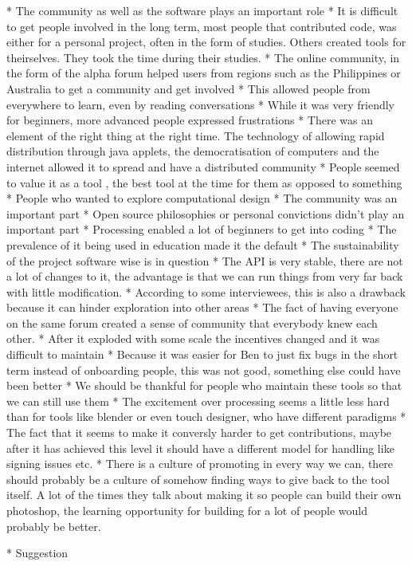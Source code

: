 
* The community as well as the software plays an important role
* It is difficult to get people involved in the long term, most people that contributed code, was either for a personal project, often in the form of studies. Others created tools for theirselves. They took the time during their studies.
* The online community, in the form of the alpha forum helped users from regions such as the Philippines or Australia to get a community and get involved
* This allowed people from everywhere to learn, even by reading conversations
* While it was very friendly for beginners, more advanced people expressed frustrations
* There was an element of the right thing at the right time. The technology of allowing rapid distribution through java applets, the democratisation of computers and the internet allowed it to spread and have a distributed community
* People seemed to value it as a tool , the best tool at the time for them as opposed to something
* People who wanted to explore computational design
* The community was an important part
* Open source philosophies or personal convictions didn't play an important part
* Processing enabled a lot of beginners to get into coding
* The prevalence of it being used in education made it the default
* The sustainability of the project software wise is in question
* The API is very stable, there are not a lot of changes to it, the advantage is that we can run things from very far back with little modification.
* According to some interviewees, this is also a drawback because it can hinder exploration into other areas
* The fact of having everyone on the same forum created a sense of community that everybody knew each other.
* After it exploded with some scale the incentives changed and it was difficult to maintain
* Because it was easier for Ben to just fix bugs in the short term instead of onboarding people, this was not good, something else could have been better
* We should be thankful for people who maintain these tools so that we can still use them
* The excitement over processing seems a little less hard than for tools like blender or even touch designer, who have different paradigms
* The fact that it seems to make it conversly harder to get contributions, maybe after it has achieved this level it should have a different model for handling like signing issues etc.
* There is a culture of promoting in every way we can, there should probably be a culture of somehow finding ways to give back to the tool itself. A lot of the times they talk about making it so people can build their own photoshop, the learning opportunity for building for a lot of people would probably be better.


* Suggestion
